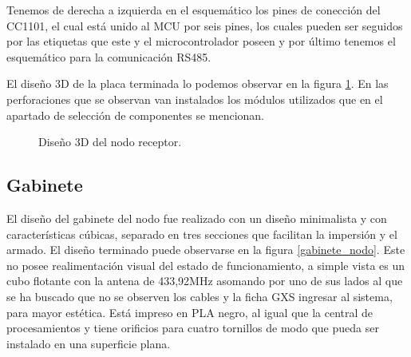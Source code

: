 Tenemos de derecha a izquierda en el esquemático los pines de conección del CC1101, el cual está unido al MCU por seis pines, los 
cuales pueden ser seguidos por las etiquetas que este y el microcontrolador poseen y por último tenemos el esquemático para 
la comunicación RS485. \par 

El diseño 3D de la placa terminada lo podemos observar en la figura \ref{3d_nodo}. En las perforaciones que se observan van 
instalados los módulos utilizados que en el apartado de selección de componentes se mencionan.


\begin{figure}[!h]
	\begin{center}
		\caption{Diseño 3D del nodo receptor.}
		\label{3d_nodo}
	\end{center}
\end{figure}


\subsection{Gabinete}

El diseño del gabinete del nodo fue realizado con un diseño minimalista y con características cúbicas, separado en tres secciones que facilitan
la impersión y el armado. El diseño terminado puede observarse en la figura \ref{gabinete_nodo}. Este no posee realimentación visual del estado 
de funcionamiento, a simple vista es un cubo flotante con la antena de 433,92MHz asomando por uno de sus lados al que se ha buscado que no 
se observen los cables y la ficha GXS ingresar al sistema, para mayor estética. Está impreso en PLA negro, al igual que la central de 
procesamientos y tiene orificios para cuatro tornillos de modo que pueda ser instalado en una superficie plana.  \par 

